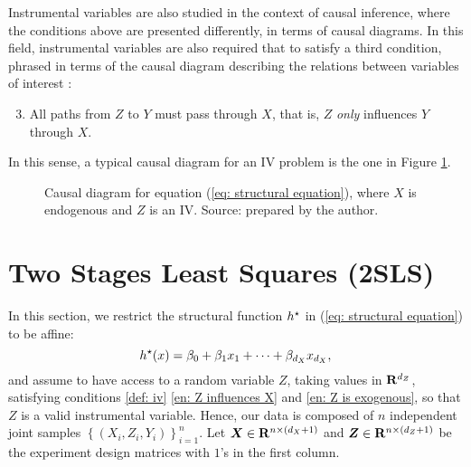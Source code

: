 Instrumental variables are also studied in the context of causal inference, where the conditions above are presented differently, in terms of causal diagrams.
In this field, instrumental variables are also required that to satisfy a third condition, phrased in terms of the causal diagram describing the relations between variables of interest \cite{hernan2020}:
\begin{enumerate}
    \setcounter{enumi}{2}
    \item All paths from $ Z $ to $ Y $ must pass through $ X $, that is, $ Z $ \emph{only} influences $ Y $ through $ X $.
\end{enumerate}
In this sense, a typical causal diagram for an IV problem is the one in Figure \ref{fig: causal diagram iv}.
\begin{figure}[t]
    \begin{center}
    \end{center}
    \caption{Causal diagram for equation (\ref{eq: structural equation}), where $ X $ is endogenous and $ Z $ is an IV.
    Source: prepared by the author.}
    \label{fig: causal diagram iv}
\end{figure}

\section{Two Stages Least Squares (2SLS)}

In this section, we restrict the structural function $ h^{ \star } $ in (\ref{eq: structural equation}) to be affine:
\begin{equation}
    \label{}
    h^{ \star } ( x ) = \beta_{ 0 } + \beta_{ 1 } x_{ 1 } + \cdots + \beta_{ d_{ X } } x_{ d_{ X } }
,\end{equation}
and assume to have access to a random variable $ Z $, taking values in $ \mathbf{R}^{ d_{ Z } } $, satisfying conditions \ref{def: iv} \ref{en: Z influences X} and \ref{en: Z is exogenous}, so that $ Z $ is a valid instrumental variable.
Hence, our data is composed of $ n $ independent joint samples $ \left\{ ( X_{ i }, Z_{ i }, Y_{ i } ) \right\}_{ i=1 }^{ n } $.
Let $ \boldsymbol X \in \mathbf{R}^{ n \times (d_{ X } + 1) } $ and $ \boldsymbol Z \in \mathbf{R}^{ n \times ( d_{ Z } + 1 ) } $ be the experiment design matrices with $ 1 $'s in the first column.

